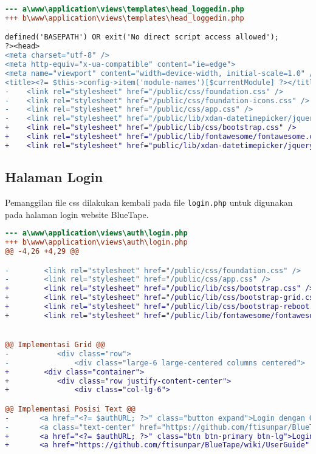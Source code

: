 \begin{lstlisting}[language=diff, caption=Perubahan file \path{\views\templates\head_loggedin.php}, label=Entri, basicstyle=\ttfamily, frame=single,
columns=fullflexible, keepspaces=true, breaklines=true]
--- a\www\application\views\templates\head_loggedin.php
+++ b\www\application\views\templates\head_loggedin.php

defined('BASEPATH') OR exit('No direct script access allowed');
?><head>
<meta charset="utf-8" />
<meta http-equiv="x-ua-compatible" content="ie=edge">
<meta name="viewport" content="width=device-width, initial-scale=1.0" />
<title><?= $this->config->item('module-names')[$currentModule] ?></title>
-    <link rel="stylesheet" href="/public/css/foundation.css" />
-    <link rel="stylesheet" href="/public/css/foundation-icons.css" />
-    <link rel="stylesheet" href="/public/css/app.css" />
-    <link rel="stylesheet" href="/public/lib/xdan-datetimepicker/jquery.datetimepicker.min.css" />
+    <link rel="stylesheet" href="/public/lib/css/bootstrap.css" />
+    <link rel="stylesheet" href="/public/lib/fontawesome/fontawesome.css">
+    <link rel="stylesheet" href="public/lib/xdan-datetimepicker/jquery.datetimepicker.min.css">
\end{lstlisting}

\subsection{Halaman Login}
Pemanggilan file css dilakukan kembali pada file \texttt{login.php} untuk digunakan pada halaman login website BlueTape.
\begin{lstlisting}[language=diff, caption=Perubahan file \path{\views\auth\login.php}, label=Entri, basicstyle=\ttfamily, frame=single,
columns=fullflexible, keepspaces=true, breaklines=true]
--- a\www\application\views\auth\login.php	
+++ b\www\application\views\auth\login.php	
@@ -4,26 +4,29 @@

-        <link rel="stylesheet" href="/public/css/foundation.css" />
-        <link rel="stylesheet" href="/public/css/app.css" />
+        <link rel="stylesheet" href="/public/lib/css/bootstrap.css" />
+        <link rel="stylesheet" href="/public/lib/css/bootstrap-grid.css" />
+        <link rel="stylesheet" href="/public/lib/css/bootstrap-reboot.css" />
+        <link rel="stylesheet" href="/public/lib/fontawesome/fontawesome.css" />


@@ Implementasi Grid @@
-        	<div class="row">
-        		<div class="large-6 large-centered columns centered">
+        <div class="container">
+        	<div class="row justify-content-center">
+        		<div class="col-lg-6">

@@ Implementasi Posisi Text @@
- 		<a href="<?= $authURL; ?>" class="button expand">Login dengan Google</a><br/><br/>
- 		<a class="text-center" href="https://github.com/ftisunpar/BlueTape/wiki/UserGuide" target="_blank">Petunjuk Penggunaan</a>
+ 		<a href="<?= $authURL; ?>" class="btn btn-primary btn-lg">Login dengan Google</a><br/><br/>
+ 		<a href="https://github.com/ftisunpar/BlueTape/wiki/UserGuide" target="_blank">Petunjuk Penggunaan</a>
\end{lstlisting}

